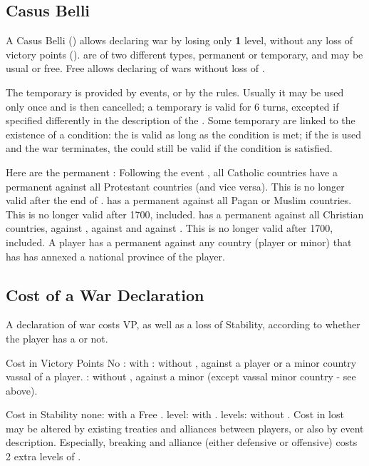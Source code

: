 \subsection{Casus Belli}

\aparag A Casus Belli (\CB) allows declaring war by losing only {\bf 1} \STAB
level, without any loss of victory points (\VP). \CB are of two different
types, permanent or temporary, and may be usual or free. Free \CB allows
declaring of wars without loss of \STAB.

 The temporary \CB is provided by events, or by
the rules. Usually it may be used only once and is then cancelled; a temporary
\CB is valid for 6 turns, excepted if specified differently in the description
of the \CB. Some temporary \CB are linked to the existence of a condition: the
\CB is valid as long as the condition is met; if the \CB is used and the war
terminates, the \CB could still be valid if the condition is satisfied.

 Here are the permanent \CB:
\bparag Following the event , all Catholic countries
have a permanent \CB against all Protestant countries (and vice versa). This
is no longer valid after the end of .
\bparag \SPA has a permanent \CB against all Pagan or Muslim countries.  This
is no longer valid after 1700, included.
\bparag \TUR has a permanent \CB against all Christian countries, against
, against \paysEgypte and against \paysDamas. This is no longer
valid after 1700, included.
\bparag A player has a permanent \CB against any country (player or minor)
that has has annexed a national province of the player.



\subsection{Cost of a War Declaration}

\aparag A declaration of war costs VP, as well as a loss of Stability,
according to whether the player has a \CB or not.

\aparag Cost in Victory Points
\bparag No \VP: with \CB
{} \VP: without \CB, against a player or a minor country vassal of a
player.
 \VP: without \CB, against a minor (except vassal minor country -
see above).

\aparag Cost in Stability
\bparag none: with a Free \CB.
 level: with \CB.
 levels: without \CB.
\bparag[Note]
Cost in lost \STAB may be altered by existing treaties and alliances between
players, or also by event description. Especially, breaking and alliance
(either defensive or offensive) costs 2 extra levels of \STAB.

